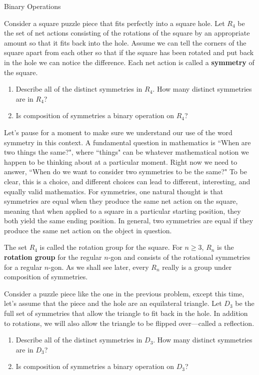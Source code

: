 \begin{section}{Binary Operations}
\begin{problem}\label{prob:introducing_R4}
Consider a square puzzle piece that fits perfectly into a square hole.  Let $R_4$ be the set of net actions consisting of the rotations of the square by an appropriate amount so that it fits back into the hole. Assume we can tell the corners of the square apart from each other so that if the square has been rotated and put back in the hole we can notice the difference. Each net action is called a \textbf{symmetry} of the square. 
\begin{enumerate}[label=\textrm{(\alph*)}]
\item Describe all of the distinct symmetries in $R_4$. How many distinct symmetries are in $R_4$?
\item Is composition of symmetries a binary operation on $R_4$?
\end{enumerate}
\end{problem}

Let's pause for a moment to make sure we understand our use of the word symmetry in this context. A fundamental question in mathematics is ``When are two things the same?", where ``things" can be whatever mathematical notion we happen to be thinking about at a particular moment. Right now we need to answer, ``When do we want to consider two symmetries to be the same?" To be clear, this is a choice, and different choices can lead to different, interesting, and equally valid mathematics. For symmetries, one natural thought is that symmetries are equal when they produce the same net action on the square, meaning that when applied to a square in a particular starting position, they both yield the same ending position. In general, two symmetries are equal if they produce the same net action on the object in question.

The set $R_4$ is called the rotation group for the square. For $n\geq 3$, $R_n$ is the \textbf{rotation group} for the regular $n$-gon and consists of the rotational symmetries for a regular $n$-gon. As we shall see later, every $R_n$ really is a group under composition of symmetries.

\begin{problem}\label{prob:introducing_D3}
Consider a puzzle piece like the one in the previous problem, except this time, let's assume that the piece and the hole are an equilateral triangle.  Let $D_3$ be the full set of symmetries that allow the triangle to fit back in the hole.  In addition to rotations, we will also allow the triangle to be flipped over---called a reflection. 
\begin{enumerate}[label=\textrm{(\alph*)}]
\item Describe all of the distinct symmetries in $D_3$. How many distinct symmetries are in $D_3$?
\item Is composition of symmetries a binary operation on $D_3$?
\end{enumerate}
\end{problem}


\end{section}
